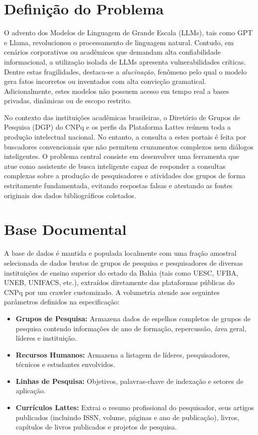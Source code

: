 \documentclass[12pt,a4paper]{article}
\begin{document}
\newpage
\tableofcontents
\newpage

\section{Definição do Problema}
O advento dos Modelos de Linguagem de Grande Escala (LLMs), tais como GPT e Llama, revolucionou o processamento de linguagem natural. Contudo, em cenários corporativos ou acadêmicos que demandam alta confiabilidade informacional, a utilização isolada de LLMs apresenta vulnerabilidades críticas. Dentre estas fragilidades, destaca-se a \textit{alucinação}, fenômeno pelo qual o modelo gera fatos incorretos ou inventados com alta convicção gramatical. Adicionalmente, estes modelos não possuem acesso em tempo real a bases privadas, dinâmicas ou de escopo restrito.

No contexto das instituições acadêmicas brasileiras, o Diretório de Grupos de Pesquisa (DGP) do CNPq e os perfis da Plataforma Lattes reúnem toda a produção intelectual nacional. No entanto, a consulta a estes portais é feita por buscadores convencionais que não permitem cruzamentos complexos nem diálogos inteligentes. O problema central consiste em desenvolver uma ferramenta que atue como assistente de busca inteligente capaz de responder a consultas complexas sobre a produção de pesquisadores e atividades dos grupos de forma estritamente fundamentada, evitando respostas falsas e atestando as fontes originais dos dados bibliográficos coletados.

\section{Base Documental}
A base de dados é mantida e populada localmente com uma fração amostral selecionada de dados brutos de grupos de pesquisa e pesquisadores de diversas instituições de ensino superior do estado da Bahia (tais como UESC, UFBA, UNEB, UNIFACS, etc.), extraídos diretamente das plataformas públicas do CNPq por um crawler customizado. A volumetria atende aos seguintes parâmetros definidos na especificação:
\begin{itemize}
    \item \textbf{Grupos de Pesquisa:} Armazena dados de espelhos completos de grupos de pesquisa contendo informações de ano de formação, repercussão, área geral, líderes e instituição.
    \item \textbf{Recursos Humanos:} Armazena a listagem de líderes, pesquisadores, técnicos e estudantes envolvidos.
    \item \textbf{Linhas de Pesquisa:} Objetivos, palavras-chave de indexação e setores de aplicação.
    \item \textbf{Currículos Lattes:} Extrai o resumo profissional do pesquisador, seus artigos publicados (incluindo ISSN, volume, páginas e ano de publicação), livros, capítulos de livros publicados e projetos de pesquisa.
\end{itemize}
\end{document}
